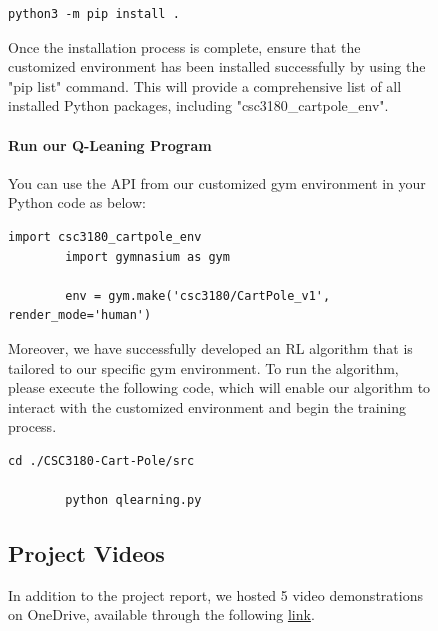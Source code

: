 \documentclass[10pt,a4paper]{article}
\begin{document}
\begin{figure}[H]
\begin{lstlisting}[caption={To use setup.py to install our env packet}]
		python3 -m pip install .
	\end{lstlisting}
	
	Once the installation process is complete, ensure that the customized environment has been installed successfully by using the "pip list" command. This will provide a comprehensive list of all installed Python packages, including  "csc3180\_cartpole\_env".
	
	
	\paragraph{Run our Q-Leaning Program}
	You can use the API from our customized gym environment in your Python code as below:
	\begin{lstlisting}[caption={use the customized environment in python}]
		import csc3180_cartpole_env
		import gymnasium as gym
		
		env = gym.make('csc3180/CartPole_v1', render_mode='human')
	\end{lstlisting}
	
	Moreover, we have successfully developed an RL algorithm that is tailored to our specific gym environment. To run the algorithm, please execute the following code, which will enable our algorithm to interact with the customized environment and begin the training process.
	
	\begin{lstlisting}[caption={To use setup.py to install our env packet}]
		cd ./CSC3180-Cart-Pole/src
		
		python qlearning.py
	\end{lstlisting}
	
	\subsection{Project Videos}
	In addition to the project report, we hosted 5 video demonstrations on OneDrive, available through the following \href{https://1drv.ms/f/s!AmutmbT5H6Pkm0sNJx83Q54XewmB?e=HUkzYK}{link}.
	
	

\end{figure}
\end{document}
